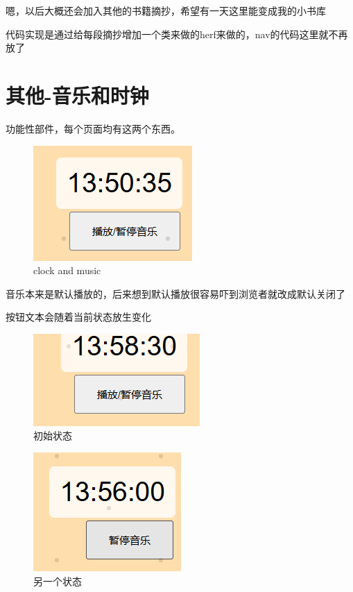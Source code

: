 \documentclass[supercite]{Experimental_Report}
\theoremstyle{definition}
\begin{document}
嗯，以后大概还会加入其他的书籍摘抄，希望有一天这里能变成我的小书库

代码实现是通过给每段摘抄增加一个类来做的herf来做的，nav的代码这里就不再放了

\newpage
\section{其他-音乐和时钟}

功能性部件，每个页面均有这两个东西。
\begin{figure}[htb]
	\begin{center}
		\includegraphics[scale=0.40]{images/7-1.png}
		\caption{clock and music}
		\label{fig7-1}
	\end{center}
\end{figure}

音乐本来是默认播放的，后来想到默认播放很容易吓到浏览者就改成默认关闭了

按钮文本会随着当前状态放生变化
\begin{figure}[htb]
	\begin{center}
		\includegraphics[scale=0.40]{images/7-2.png}
		\caption{初始状态}
		\label{fig7-2}
	\end{center}
\end{figure}

\begin{figure}[htb]
\begin{center}
	\includegraphics[scale=0.40]{images/7-3.png}
	\caption{另一个状态}
	\label{fig7-3}
\end{center}
\end{figure}
\end{document}

